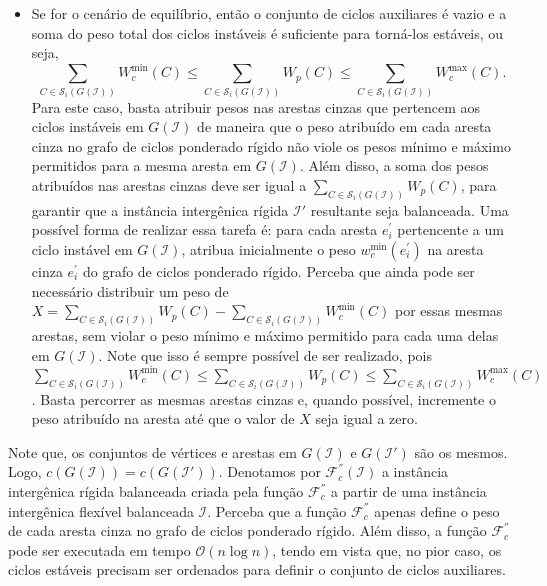 \begin{itemize}
\begin{itemize}
    \item Se for o cenário de equilíbrio, então o conjunto de ciclos auxiliares é vazio e a soma do peso total dos ciclos instáveis é suficiente para torná-los estáveis, ou seja, $$\sum_{C \in \mathcal{S}_i(G(\mathcal{I}))} W^{\min}_c(C) \le \sum_{C \in \mathcal{S}_i(G(\mathcal{I}))} W_p(C) \le \sum_{C \in \mathcal{S}_i(G(\mathcal{I}))} W^{\max}_c(C).$$ Para este caso, basta atribuir pesos nas arestas cinzas que pertencem aos ciclos instáveis em $G(\mathcal{I})$ de maneira que o peso atribuído em cada aresta cinza no grafo de ciclos ponderado rígido não viole os pesos mínimo e máximo permitidos para a mesma aresta em $G(\mathcal{I})$. Além disso, a soma dos pesos atribuídos nas arestas cinzas deve ser igual a $\sum_{C \in \mathcal{S}_i(G(\mathcal{I}))} W_p(C)$, para garantir que a instância intergênica rígida $\mathcal{I}'$ resultante seja balanceada. Uma possível forma de realizar essa tarefa é: para cada aresta $e^{\prime}_i$ pertencente a um ciclo instável em $G(\mathcal{I})$, atribua inicialmente o peso $w^{\min}_c(e^{\prime}_i)$ na aresta cinza $e^{\prime}_i$ do grafo de ciclos ponderado rígido. Perceba que ainda pode ser necessário distribuir um peso de $X = \sum_{C \in \mathcal{S}_i(G(\mathcal{I}))} W_p(C) - \sum_{C \in \mathcal{S}_i(G(\mathcal{I}))} W^{\min}_c(C)$ por essas mesmas arestas, sem violar o peso mínimo e máximo permitido para cada uma delas em $G(\mathcal{I})$. Note que isso é sempre possível de ser realizado, pois $\sum_{C \in \mathcal{S}_i(G(\mathcal{I}))} W^{\min}_c(C) \le \sum_{C \in \mathcal{S}_i(G(\mathcal{I}))} W_p(C) \le \sum_{C \in \mathcal{S}_i(G(\mathcal{I}))} W^{\max}_c(C)$. Basta percorrer as mesmas arestas cinzas e, quando possível, incremente o peso atribuído na aresta até que o valor de $X$ seja igual a zero.
  \end{itemize}
\end{itemize}

Note que, os conjuntos de vértices e arestas em $G(\mathcal{I})$ e $G(\mathcal{I}')$ são os mesmos. Logo, $c(G(\mathcal{I})) = c(G(\mathcal{I}'))$. Denotamos por $\mathcal{F}_{c}^{''}(\mathcal{I})$ a instância intergênica rígida balanceada criada pela função $\mathcal{F}_{c}^{''}$ a partir de uma instância intergênica flexível balanceada $\mathcal{I}$. Perceba que a função $\mathcal{F}_{c}^{''}$ apenas define o peso de cada aresta cinza no grafo de ciclos ponderado rígido. Além disso, a função $\mathcal{F}_{c}^{''}$ pode ser executada em tempo $\mathcal{O}(n \log n)$, tendo em vista que, no pior caso, os ciclos estáveis precisam ser ordenados para definir o conjunto de ciclos auxiliares.

